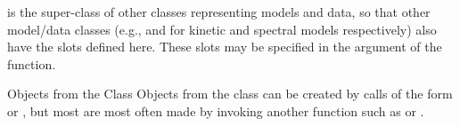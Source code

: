 \documentclass{article}
\begin{document}
\begin{Description}\relax
{} is the super-class of other classes representing models and data, so
that other model/data classes (e.g.,  and  
for kinetic and spectral
models respectively) also have the slots defined here.  These slots may
be specified in the  
argument of the   function.
\end{Description}
\begin{Section}{Objects from the Class}
Objects from the class 
can be created by calls of the form  or 
, but 
most are most often made by invoking another function such as 
 or .
\end{Section}
\end{document}
